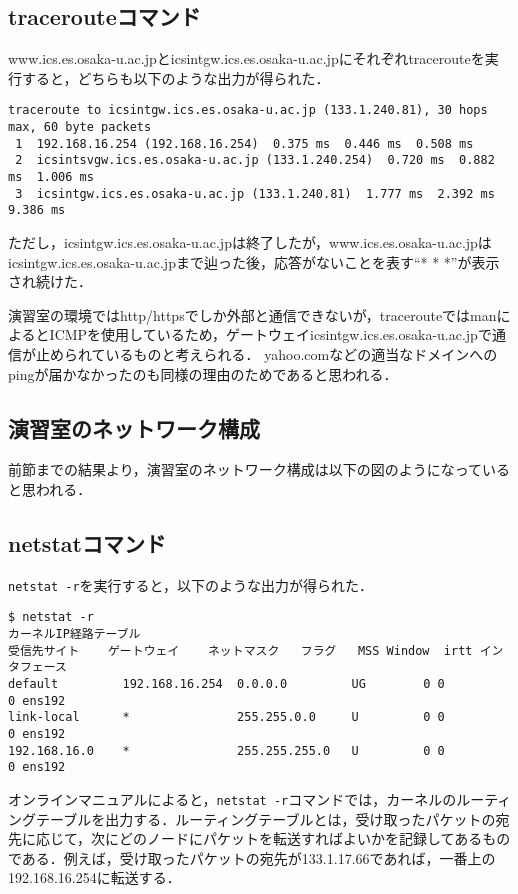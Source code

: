 \documentclass[a4j,10pt,titlepage]{jsarticle}
\begin{document}
\subsection{tracerouteコマンド}
www.ics.es.osaka-u.ac.jpとicsintgw.ics.es.osaka-u.ac.jpにそれぞれtracerouteを実行すると，どちらも以下のような出力が得られた．
\begin{verbatim}
traceroute to icsintgw.ics.es.osaka-u.ac.jp (133.1.240.81), 30 hops max, 60 byte packets
 1  192.168.16.254 (192.168.16.254)  0.375 ms  0.446 ms  0.508 ms
 2  icsintsvgw.ics.es.osaka-u.ac.jp (133.1.240.254)  0.720 ms  0.882 ms  1.006 ms
 3  icsintgw.ics.es.osaka-u.ac.jp (133.1.240.81)  1.777 ms  2.392 ms  9.386 ms
\end{verbatim}

ただし，icsintgw.ics.es.osaka-u.ac.jpは終了したが，www.ics.es.osaka-u.ac.jpはicsintgw.ics.es.osaka-u.ac.jpまで辿った後，応答がないことを表す``* * *''が表示され続けた．

演習室の環境ではhttp/httpsでしか外部と通信できないが，tracerouteではmanによるとICMPを使用しているため，ゲートウェイicsintgw.ics.es.osaka-u.ac.jpで通信が止められているものと考えられる．
yahoo.comなどの適当なドメインへのpingが届かなかったのも同様の理由のためであると思われる．

\subsection{演習室のネットワーク構成}
前節までの結果より，演習室のネットワーク構成は以下の図のようになっていると思われる．


\subsection{netstatコマンド}
\verb|netstat -r|を実行すると，以下のような出力が得られた．
\begin{verbatim}
$ netstat -r
カーネルIP経路テーブル
受信先サイト    ゲートウェイ    ネットマスク   フラグ   MSS Window  irtt インタフェース
default         192.168.16.254  0.0.0.0         UG        0 0          0 ens192
link-local      *               255.255.0.0     U         0 0          0 ens192
192.168.16.0    *               255.255.255.0   U         0 0          0 ens192
\end{verbatim}
オンラインマニュアルによると，\verb|netstat -r|コマンドでは，カーネルのルーティングテーブルを出力する．ルーティングテーブルとは，受け取ったパケットの宛先に応じて，次にどのノードにパケットを転送すればよいかを記録してあるものである．例えば，受け取ったパケットの宛先が133.1.17.66であれば，一番上の192.168.16.254に転送する．
\end{document}
